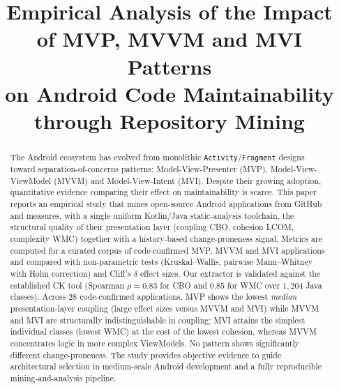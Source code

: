 \documentclass[conference]{IEEEtran}
\begin{document}
\title{Empirical Analysis of the Impact of MVP, MVVM and MVI Patterns\\
on Android Code Maintainability\\
through Repository Mining}

\author{
}

\maketitle

\begin{abstract}
The Android ecosystem has evolved from monolithic \texttt{Activity}/\texttt{Fragment}
designs toward separation-of-concerns patterns: Model-View-Presenter (MVP),
Model-View-ViewModel (MVVM) and Model-View-Intent (MVI). Despite their growing
adoption, quantitative evidence comparing their effect on maintainability is scarce.
This paper reports an empirical study that mines open-source Android applications from
GitHub and measures, with a single uniform Kotlin/Java static-analysis toolchain, the
structural quality of their presentation layer (coupling CBO, cohesion LCOM, complexity
WMC) together with a history-based change-proneness signal. Metrics are computed for a
curated corpus of code-confirmed MVP, MVVM and MVI applications and compared with
non-parametric tests (Kruskal--Wallis, pairwise Mann--Whitney with Holm correction) and
Cliff's $\delta$ effect sizes. Our extractor is validated against the established CK tool
(Spearman $\rho=0.83$ for CBO and $0.85$ for WMC over $1{,}204$ Java classes).
Across 28 code-confirmed applications, MVP shows the lowest \emph{median}
presentation-layer coupling (large effect sizes versus MVVM and MVI) while MVVM
and MVI are structurally indistinguishable in coupling; MVI attains the simplest individual
classes (lowest WMC) at the cost of the lowest cohesion, whereas MVVM concentrates
logic in more complex ViewModels. No pattern shows significantly different
change-proneness. The study provides objective evidence to guide architectural
selection in medium-scale Android development and a fully reproducible
mining-and-analysis pipeline.
\end{abstract}
\end{document}
